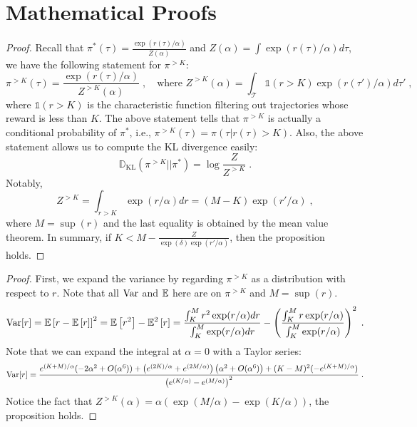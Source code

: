 \section{Mathematical Proofs}
\label{appendix_math_proof}
\klapprox*
\begin{proof}
Recall that $\pi^*(\tau) = \frac{\exp(r(\tau)/\alpha)}{Z(\alpha)}$ and $Z(\alpha) = \int \exp(r(\tau)/\alpha) d\tau$, we have the following statement for $\pi^{>K}$:
\begin{equation}
    \pi^{>K}(\tau) = \frac{\exp (r(\tau)/\alpha)}{Z^{>K}(\alpha)} \; , \quad \text{where } Z^{>K}(\alpha) = \int_{\mathcal{T}} \mathds{1}(r>K) \exp (r(\tau')/\alpha) d\tau' \; ,
\end{equation}
where $\mathds{1}(r>K)$ is the characteristic function filtering out trajectories whose reward is less than $K$.
The above statement tells that $\pi^{>K}$ is actually a conditional probability of $\pi^*$, i.e., $\pi^{>K}(\tau)=\pi(\tau | r(\tau)>K)$.
Also, the above statement allows us to compute the KL divergence easily:
\begin{equation}
    \mathds{D}_{\text{KL}}(\pi^{>K} || \pi^*) = \log \frac{Z}{Z^{>K}} \; .
\end{equation}
Notably,
\begin{equation}
     Z^{>K} = \int_{r>K} \exp(r / \alpha) dr = (M-K)\exp(r'/\alpha) \; ,
\end{equation}
where $M = \sup (r) $ and the last equality is obtained by the mean value theorem.
In summary, if $K < M - \frac{Z}{\exp(\delta) \exp(r'/\alpha)}$, then the proposition holds.

\end{proof}



\varapprox*
\begin{proof}
First, we expand the variance by regarding $\pi^{>K}$ as a distribution with respect to $r$.
Note that all $\mathrm{Var}$ and $\mathbb{E}$ here are on $\pi^{>K}$ and $M=\sup(r)$.
\begin{equation}
    \mathrm{Var}[r] = \mathbb{E} \left[r - \mathbb{E} \left[ r \right] \right]^2 = \mathbb{E} \left[r^2 \right] - \mathbb{E}^2 \left[r \right] 
    =\frac{\int^M_K r^2 \exp(r/\alpha) dr}{ \int^M_K \exp(r/\alpha)dr} - \left( \frac{\int^M_K r \exp(r/\alpha) }{\int^M_K \exp(r/\alpha)} \right)^2 \; .
\end{equation}
Note that we can expand the integral at $\alpha=0$ with a Taylor series:
\begin{equation}
    \begin{aligned}
    \mathrm{Var}[r] =
    \frac{e^{(K+M)/\alpha}(-2\alpha^2 + O(\alpha^6)) + \left( e^{(2K)/\alpha} + e^{(2M/\alpha)}\right)\left(\alpha^2 + O(\alpha^6) \right) + (K-M)^2(-e^{(K+M)/\alpha}) }{\left(e^{(K/\alpha)} - e^{(M/\alpha)} \right)^2} \; .
    \end{aligned}
\end{equation}
Notice the fact that $Z^{>K}(\alpha)=\alpha(\exp(M/\alpha) - \exp(K/\alpha))$, the proposition holds.
\end{proof}


